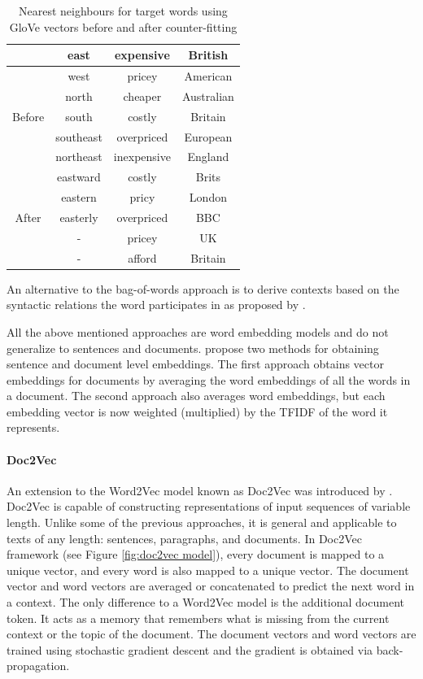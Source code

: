  \begin{table}[h]
 	\begin{center}
 		\begin{tabular}{ c c c c } 
 			\hline
 			& east & expensive & British \\
 			\hline
 			\multirow{5}{4em}{Before} &
 			
 			west & pricey &  American
 			\\ 
 			& north & cheaper & Australian\\ 
 			& south & costly & Britain\\ 
 			& southeast & overpriced & European\\
 			& northeast & inexpensive & England\\
 			\hline
 			\multirow{5}{4em}{After} & 
 			eastward & costly & Brits\\ 
 			& eastern & pricy & London\\ 
 			& easterly & overpriced & BBC\\ 
 			& - & pricey & UK\\ 
 			& - & afford & Britain\\ 
 			\hline
 		\end{tabular}
 		
 	\end{center}
 	
 	\caption{Nearest neighbours for target words using GloVe
 		vectors before and after counter-fitting} \label{tab:counter_fitting}
 \end{table}
 
 An alternative to
 the bag-of-words approach is to derive contexts
 based on the syntactic relations the word participates
 in as proposed by \citet{levy2014dependency}.

All the above mentioned approaches are word embedding models and do not generalize to sentences and documents. \citet{jsnior2017nilc} propose two methods for obtaining sentence and document level embeddings. The first approach obtains vector embeddings for documents by averaging the word embeddings of all the words in a document. The second approach also averages word embeddings, but each embedding vector is now weighted (multiplied) by the TFIDF
of the word it represents.
\paragraph{Doc2Vec} An extension to the Word2Vec model known as Doc2Vec was introduced by \citet{le2014distributed}. Doc2Vec is capable of constructing representations of input sequences of
variable length. Unlike some of the previous approaches, it is general and
applicable to texts of any length: sentences, paragraphs, and documents. In
Doc2Vec framework (see Figure \ref{fig:doc2vec model}), every document is mapped to a unique
vector, and every word is also mapped to a unique vector. The document
vector and word vectors are averaged or concatenated to predict the next
word in a context. The only difference to a Word2Vec model is the additional
document token. It acts as a memory that remembers what is missing from
the current context or the topic of the document. The document vectors and
word vectors are trained using stochastic gradient descent and the gradient
is obtained via back-propagation.

